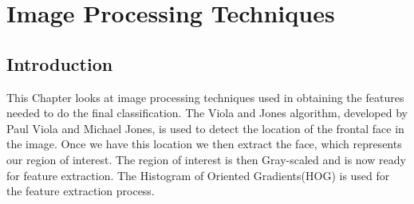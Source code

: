 \chapter{Image Processing Techniques} %
%


\section{Introduction} %
This Chapter looks at image processing techniques used in obtaining the features needed to do the final classification. The Viola and Jones algorithm, developed by Paul Viola and Michael Jones, is used to detect the location of the frontal face in the image. Once we have this location we then extract the face, which represents our region of interest. The region of interest is then Gray-scaled and is now ready for feature extraction. The Histogram of Oriented Gradients(HOG) is used for the feature extraction process. 


